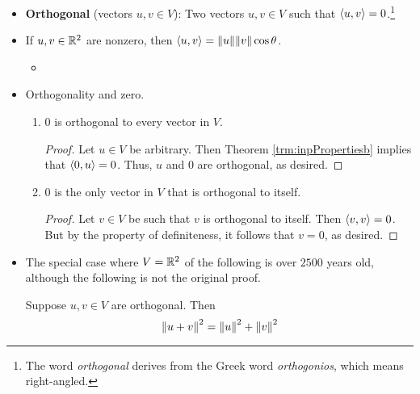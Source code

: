 \documentclass[../main.tex]{subfiles}
\begin{document}
\begin{itemize}
\begin{theorem}
    \end{theorem}
    \item \textbf{Orthogonal} (vectors $u,v\in V$): Two vectors $u,v\in V$ such that $\left\langle{u},{v}\right\rangle=0$.\footnote{The word \emph{orthogonal} derives from the Greek word \emph{orthogonios}, which means right-angled.}
    \item If $u,v\in\mathbb{R}^2$ are nonzero, then $\left\langle{u},{v}\right\rangle=\norm{u}\norm{v}\cos\theta$.
    \begin{itemize}
        \item {}
    \end{itemize}
    \item Orthogonality and zero.
    \begin{theorem}\leavevmode
        \begin{enumerate}[label={\textup{(}\alph*\textup{)}}]
            \item $0$ is orthogonal to every vector in $V$.
            \begin{proof}
                Let $u\in V$ be arbitrary. Then Theorem \ref{trm:inpPropertiesb} implies that $\left\langle{0},{u}\right\rangle=0$. Thus, $u$ and 0 are orthogonal, as desired.
            \end{proof}
            \item $0$ is the only vector in $V$ that is orthogonal to itself.
            \begin{proof}
                Let $v\in V$ be such that $v$ is orthogonal to itself. Then $\left\langle{v},{v}\right\rangle=0$. But by the property of definiteness, it follows that $v=0$, as desired.
            \end{proof}
        \end{enumerate}
    \end{theorem}
    \item The special case where $V=\mathbb{R}^2$ of the following is over $\num{2500}$ years old, although the following is not the original proof.
    \begin{theorem}\label{trm:pythagorean}
        Suppose $u,v\in V$ are orthogonal. Then
        \begin{equation*}
            \norm{u+v}^2 = \norm{u}^2+\norm{v}^2
        \end{equation*}

\end{theorem}
\end{itemize}
\end{document}
